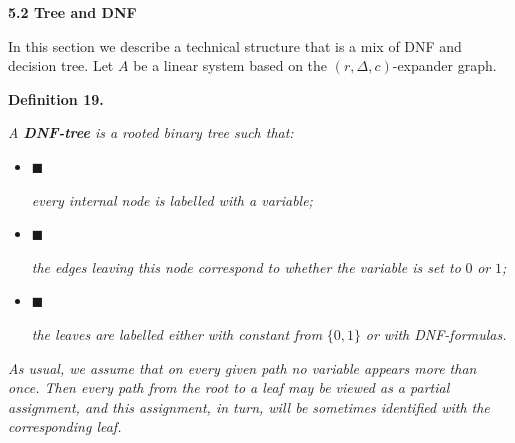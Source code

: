 \documentclass[10pt,a4paper]{article}
\begin{document}
\par\medskip\noindent\textbf{
5.2 Tree and DNF}\par




In this section we describe a technical structure that is a mix of DNF and decision tree. Let $A$ be a
linear system based on the $(r,\Delta,c)$-expander graph.\par





\par\medskip\noindent\textbf{
\textbf{Definition 19}\textbf{.}
}\par



\emph{A \textbf{DNF-tree} is a rooted binary tree such that:}\par


\begin{itemize}


\item[] 
$\blacksquare$ 


\emph{every internal node is labelled with a variable;}\par





\item[] 
$\blacksquare$ 


\emph{the edges leaving this node correspond to whether the variable is set to }$0$\emph{ or }$1$\emph{;}\par





\item[] 
$\blacksquare$ 


\emph{the leaves are labelled either with constant from }$\{0,1\}$\emph{ or with DNF-formulas.}\par





\end{itemize}




\emph{As usual, we assume that on every given path no variable appears more than once. Then every path from
the root to a leaf may be viewed as a partial assignment, and this assignment, in turn, will be
sometimes identified with the corresponding leaf.}\par
\end{document}
